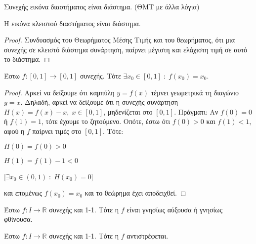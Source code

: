 \begin{thm}
  Συνεχής εικόνα διαστήματος είναι διάστημα. (ΘΜΤ με άλλα λόγια)
\end{thm}

\begin{prop}
  Η εικόνα κλειστού διαστήματος είναι διάστημα. 
\end{prop}

\begin{proof}
  Συνδυασμός του Θεωρήματος Μέσης Τιμής και του θεωρήματος, ότι μια συνεχής σε 
  κλειστό διάστημα συνάρτηση, παίρνει μέγιστη και ελάχιστη τιμή σε αυτό το διάστημα.
\end{proof}

\begin{thm}
  Έστω $ f \colon [0,1] \to [0,1] $ συνεχής. Τότε $ \exists x_{0} \in [0,1] \; 
  : \; f(x_{0}) = x_{0} $.
\end{thm}

\begin{proof}
\item {}
  Αρκεί να δείξουμε ότι καμπύλη $ y= f(x) $ τέμνει γεωμετρικά τη διαγώνιο $ y=x $.
  Δηλαδή, αρκεί να δείξουμε ότι η συνεχής συνάρτηση $ H(x) = f(x)-x, \; x \in [0,1] $, 
  μηδενίζεται στο $ [0,1] $. Πράγματι:
  Αν $ f(0)=0 $ ή $ f(1)= 1 $, τότε έχουμε το ζητούμενο. Οπότε, έστω ότι 
  $ f(0) > 0 $ και $ f(1)<1 $, αφού η $ f $ παίρνει τιμές στο $ [0,1] $. Τότε:

  \begin{minipage}{0.3\textwidth}
    \begin{myitemize}
      \item $ H(0) = f(0) > 0 $ \hfill {}
      \item $ H(1) = f(1)-1 < 0 $ \hfill {}
    \end{myitemize}
  \end{minipage}
  [$ \exists x_{0} \in (0,1) \; : \; H(x_{0}) = 0$]

  και επομένως $ f(x_{0}) = x_{0} $ και το θεώρημα έχει αποδειχθεί.
\end{proof}

\begin{thm}
  Έστω $ f \colon I \to \mathbb{R} $ συνεχής και 1-1. Τότε η $f$ είναι 
  γνησίως αύξουσα ή γνησίως φθίνουσα.
\end{thm}

\begin{thm}
  Έστω $ f \colon I \to \mathbb{R} $ συνεχής και 1-1. Τότε η $f$ αντιστρέφεται.
\end{thm}

